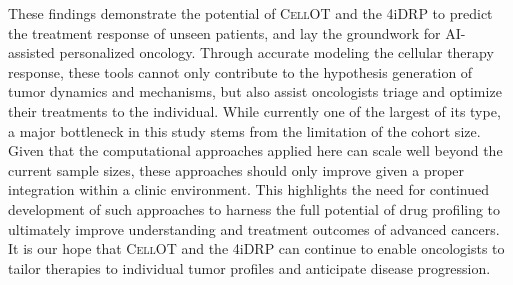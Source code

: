 These findings demonstrate the potential of \textsc{CellOT} and the 4iDRP to predict the treatment response of unseen patients, and lay the groundwork for AI-assisted personalized oncology.
Through accurate modeling the cellular therapy response, these tools cannot only contribute to the hypothesis generation of tumor dynamics and mechanisms, but also assist oncologists triage and optimize their treatments to the individual.
While currently one of the largest of its type, a major bottleneck in this study stems from the limitation of the cohort size.
Given that the computational approaches applied here can scale well beyond the current sample sizes, these approaches should only improve given a proper integration within a clinic environment.
This highlights the need for continued development of such approaches to harness the full potential of drug profiling to ultimately improve understanding and treatment outcomes of advanced cancers.
It is our hope that \textsc{CellOT} and the 4iDRP can continue to enable oncologists to tailor therapies to individual tumor profiles and anticipate disease progression.

